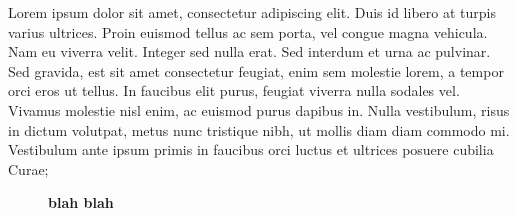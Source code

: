 \documentclass[a4paper, 11pt]{article} %
\begin{document}
Lorem ipsum dolor sit amet, consectetur adipiscing elit. Duis id libero at
turpis varius ultrices. Proin euismod tellus ac sem porta, vel congue magna
vehicula. Nam eu viverra velit. Integer sed nulla erat. Sed interdum et urna ac
pulvinar. Sed gravida, est sit amet consectetur feugiat, enim sem molestie
lorem, a tempor orci eros ut tellus. In faucibus elit purus, feugiat viverra
nulla sodales vel. Vivamus molestie nisl enim, ac euismod purus dapibus in.
Nulla vestibulum, risus in dictum volutpat, metus nunc tristique nibh, ut
mollis diam diam commodo mi. Vestibulum ante ipsum primis in faucibus orci
luctus et ultrices posuere cubilia Curae; 

\begin{figure}
  \centering
  \caption*{\textbf{blah blah}}


\end{figure}
\end{document}
